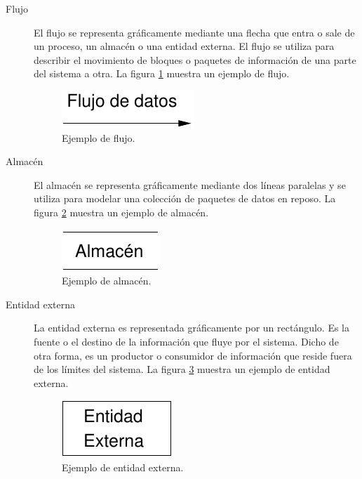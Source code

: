 \begin{description}
   \item[Flujo] El flujo se representa gráficamente mediante una flecha que
        entra o sale de un proceso, un almacén o una entidad externa. El flujo
        se utiliza para describir el movimiento de bloques o paquetes de
        información de una parte del sistema a otra. La figura
        \ref{diagramaFlujo} muestra un ejemplo de flujo.

        \begin{figure}[!ht]
            \begin{center}
            \includegraphics[]{08.Analisis_Funcional/8.2.DFDs/Diagramas/flujo.pdf}
            \caption{Ejemplo de flujo.}
            \label{diagramaFlujo}
            \end{center}
         \end{figure}

   \item[Almacén] El almacén se representa gráficamente mediante dos líneas
        paralelas y se utiliza para modelar una colección de paquetes
        de datos en reposo. La figura \ref{diagramaAlmacen} muestra un ejemplo
        de almacén.

        \begin{figure}[!ht]
            \begin{center}
            \includegraphics[]{08.Analisis_Funcional/8.2.DFDs/Diagramas/almacen.pdf}
            \caption{Ejemplo de almacén.}
            \label{diagramaAlmacen}
            \end{center}
         \end{figure}

   \item[Entidad externa] La entidad externa es representada gráficamente
        por un rectángulo. Es la fuente o el destino de la información que
        fluye por el sistema. Dicho de otra forma, es un productor o consumidor
        de información que reside fuera de los límites del sistema. La figura
        \ref{diagramaEntidadExterna} muestra un ejemplo de entidad externa.

        \begin{figure}[!ht]
            \begin{center}
            \includegraphics[]{08.Analisis_Funcional/8.2.DFDs/Diagramas/entidad_externa.pdf}
            \caption{Ejemplo de entidad externa.}
            \label{diagramaEntidadExterna}
            \end{center}
         \end{figure}
  \end{description}




